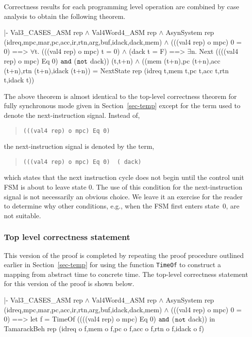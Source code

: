 Correctness results for each programming level operation
are combined by case analysis to obtain the following theorem.

\begintt
|- Val3_CASES_ASM rep \(\wedge\)
   Val4Word4_ASM rep \(\wedge\)
   AsynSystem rep (idreq,mpc,mar,pc,acc,ir,rtn,arg,buf,idack,dack,mem) \(\wedge\)
   (((val4 rep) o mpc) 0 = 0)
   ==>
   \(\forall\)t.
     (((val4 rep) o mpc) t = 0) \(\wedge\)
     (dack t = F)
     ==>
     \(\exists\)n.
       Next ((((val4 rep) o mpc) Eq 0) \(\tt{and}\) (\(\tt{not}\) dack)) (t,t+n) \(\wedge\)
       ((mem (t+n),pc (t+n),acc (t+n),rtn (t+n),idack (t+n)) =
        NextState rep (idreq t,mem t,pc t,acc t,rtn t,idack t))
\endtt

The above theorem is almost identical to the top-level correctness theorem
for fully synchronous mode
given in Section~\ref{sec-temp} except for the term used to denote the
next-instruction signal.  Instead of,

\begin{quote}
\verb"(((val4 rep) o mpc) Eq 0)"
\end{quote}

\noindent
the next-instruction signal is denoted by the term,

\begin{quote}
\verb"(((val4 rep) o mpc) Eq 0) "\TLAnd\verb" ("\TLNot\verb" dack)"
\end{quote}

\noindent
which states that the next instruction cycle does
not begin until the control unit FSM is about to leave state 0.
The use of this condition for the next-instruction signal
is not necessarily an obvious choice.
We leave it an exercise for the reader to
determine why other conditions,
e.g., when the FSM first enters state~0,
are not suitable.

\subsubsection{Top level correctness statement}

This version of the proof is completed by repeating the proof
procedure outlined earlier in Section~\ref{sec-temp}
for using the function \verb"TimeOf" to construct a mapping
from abstract time to concrete time.
The top-level correctness statement for this version of the
proof is shown below.

\begintt
|- Val3_CASES_ASM rep \(\wedge\)
   Val4Word4_ASM rep \(\wedge\)
   AsynSystem rep (idreq,mpc,mar,pc,acc,ir,rtn,arg,buf,idack,dack,mem) \(\wedge\)
   (((val4 rep) o mpc) 0 = 0)
   ==>
   let f = TimeOf ((((val4 rep) o mpc) Eq 0) \(\tt{and}\) (\(\tt{not}\) dack)) in
   TamarackBeh rep (idreq o f,mem o f,pc o f,acc o f,rtn o f,idack o f)
\endtt
